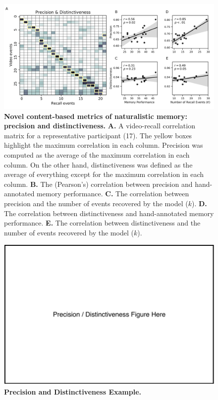 \documentclass{article}
\begin{document}
\begin{figure}[tp]
  \centering
  \includegraphics[width=1\textwidth]{figs/precision_distinctiveness}
  \caption{\small \textbf{Novel content-based metrics of naturalistic memory: precision and distinctiveness.} \textbf{A.} A video-recall correlation matrix for a representative participant (17).  The yellow boxes highlight the maximum correlation in each column.  Precision was computed as the average of the maximum correlation in each column.  On the other hand, distinctiveness was defined as the average of everything except for the maximum correlation in each column. \textbf{B.} The (Pearson's) correlation between precision and hand-annotated memory performance. \textbf{C.} The correlation between precision and the number of events recovered by the model ($k$). \textbf{D.} The correlation between distinctiveness and hand-annotated memory performance. \textbf{E.} The correlation between distinctiveness and the number of events recovered by the model ($k$).}
  \label{fig:precision-distinctiveness}
\end{figure}

\begin{figure}[tp]
\centering
\includegraphics[width=\textwidth]{figs/precision_distinctiveness_example}
\caption{\small \textbf{Precision and Distinctiveness Example.}}
\label{fig:precision-distinctiveness-example}
\end{figure}
\end{document}
